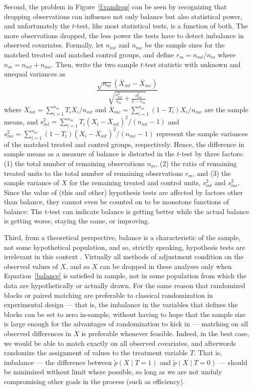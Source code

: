 \documentclass[11pt,titlepage]{article}
\begin{document}
Second, the problem in Figure~\ref{f:randrop} can be seen by
recognizing that dropping observations can influence not only balance
but also statistical power, and unfortunately the $t$-test, like most
statistical tests, is a function of both.  The more observations
dropped, the less power the tests have to detect imbalance in observed
covariates.  Formally, let $n_{mt}$ and $n_{mc}$ be the sample sizes
for the matched treated and matched control groups, and define
$r_m=n_{mt}/n_m$ where $n_m=n_{mt}+n_{mc}$. Then, write the two sample
$t$-test statistic with unknown and unequal variances as
\begin{equation}
  \label{ttest} \frac{\sqrt{n_m}(\overline{X}_{mt}-\overline{X}_{mc})}
               {\sqrt{\frac{s^2_{mt}}{r_m} + \frac{s^2_{mc}}{1-r_m}}}
\end{equation}
where $\overline{X}_{mt}=\sum_{i=1}^{n_m} T_i X_i/n_{mt}$ and
$\overline{X}_{mc}=\sum_{i=1}^{n_m} (1-T_i)X_i/n_{mc}$ are the sample
means, and $s^2_{mt}=\sum_{i=1}^{n_m} T_i(X_i -
\overline{X}_{mt})^2/(n_{mt}-1)$ and $s^2_{mc}=\sum_{i=1}^{n_m}
(1-T_i)(X_i - \overline{X}_{mt})^2/(n_{mc}-1)$ represent the sample
variances of the matched treated and control groups, respectively.
Hence, the difference in sample means as a measure of balance is
distorted in the $t$-test by three factors: (1) the total number of
remaining observations $n_m$, (2) the ratio of remaining treated units
to the total number of remaining observations $r_m$, and (3) the
sample variance of $X$ for the remaining treated and control units,
$s_{mt}^2$ and $s_{mc}^2$.  Since the value of (this and other)
hypothesis tests are affected by factors other than balance, they
cannot even be counted on to be monotone functions of balance: The
$t$-test can indicate balance is getting better while the actual
balance is getting worse, staying the same, or improving.

Third, from a theoretical perspective, balance is a characteristic of
the sample, not some hypothetical population, and so, strictly
speaking, hypothesis tests are irrelevant in this context
\citep{HoImaKin06,Hansen06}.  Virtually all methods of adjustment
condition on the observed values of $X$, and so $X$ can be dropped in
these analyses only when Equation~\ref{balance} is satisfied in
sample, not in some population from which the data are hypothetically
or actually drawn.  For the same reason that randomized blocks or
paired matching are preferable to classical randomization in
experimental design --- that is, the imbalance in the variables that
defines the blocks can be set to zero in-sample, without having to
hope that the sample size is large enough for the advantages of
randomization to kick in \citep[see also][p.264]{GreLuSil04} ---
matching on all observed differences in $X$ is preferable whenever
feasible.  Indeed, in the best case, we would be able to match exactly
on all observed covariates, and afterwords randomize the assignment of
values to the treatment variable $T$.  That is, imbalance --- the
difference between $\tilde p(X\mid T=1)$ and $\tilde p(X\mid T=0)$ ---
should be minimized without limit where possible, so long as we are
not unduly compromising other goals in the process (such as
efficiency).
\end{document}
